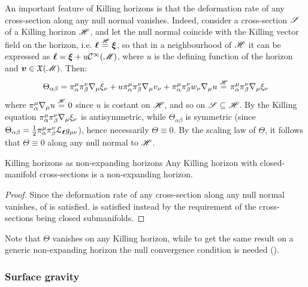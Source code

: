 An important feature of Killing horizons is that the deformation rate of any cross-section along any null normal vanishes. Indeed, consider a cross-section $ \mathscr{S} $ of a Killing horizon $ \mathscr{H} $, and let the null normal coincide with the Killing vector field on the horizon, i.e. $ \boldsymbol{\ell} \overset{\mathscr{H}}{=} \boldsymbol{\xi} $, so that in a neighbourhood of $ \mathscr{H} $ it can be expressed as $ \boldsymbol{\ell} = \boldsymbol{\xi} + u \mathcal{C}^{\infty}(\mathscr{M}) $, where $ u $ is the defining function of the horizon and $ \boldsymbol{v} \in \mathfrak{X}(\mathscr{M}) $. Then:
\begin{equation*}
  \Theta_{\alpha \beta} = \pi^\mu_\alpha \pi^\nu_\beta \nabla_\mu \xi_\nu + u \pi^\mu_\alpha \pi^\nu_\beta \nabla_\mu v_\nu + \pi^\mu_\alpha \pi^\nu_\beta w_\nu \nabla_\mu u \overset{\mathscr{H}}{=} \pi^\mu_\alpha \pi^\nu_\beta \nabla_\mu \xi_\nu
\end{equation*}
where $ \pi^\mu_\alpha \nabla_\mu u \overset{\mathscr{H}}{=} 0 $ since $ u $ is costant on $ \mathscr{H} $, and so on $ \mathscr{S} \subseteq \mathscr{H} $. By the Killing equation  $ \pi^\mu_\alpha \pi^\nu_\beta \nabla_\mu \xi_\nu $ is antisymmetric, while $ \Theta_{\alpha \beta} $ is symmetric (since $ \Theta_{\alpha \beta} = \frac{1}{2} \pi^\mu_\alpha \pi^\nu_\beta \EuScript{L}_{\boldsymbol{\ell}} g_{\mu \nu} $), hence necessarily $ \Theta \equiv 0 $. By the scaling law of $ \Theta $, it follows that $ \Theta \equiv 0 $ along any null normal to $ \mathscr{H} $.

\begin{proposition}{Killing horizons as non-expanding horizons}{}
  Any Killing horizon with closed-manifold cross-sections is a non-expanding horizon.
\end{proposition}

\begin{proofbox}
  \begin{proof}
    Since the deformation rate of any cross-section along any null normal vanishes,  of  is satisfied.  is satisfied instead by the requirement of the cross-sections being closed submanifolds.
  \end{proof}
\end{proofbox}

Note that $ \Theta $ vanishes on any Killing horizon, while to get the same result on a generic non-expanding horizon the null convergence condition is needed ().

\subsubsection{Surface gravity}

